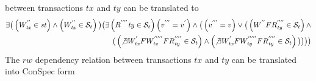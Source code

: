 \documentclass[acmlarge, ,11pt]{acmart}
\begin{document}
    between transactions $\mathit{tx}$ and $\mathit{ty}$ can be translated to \begin{align}\label{eqn:ww}
\begin{split}
 \exists \big( %
 \left( {W}^{''}_\mathit{tx} \in \mathit{st} \right)
   \wedge \left( {W}^{''}_\mathit{tx}  \in  \mathcal{S}_t \right)  \big)
   \big( %
  \exists %
  \left( { R}^{''''}\mathit{ty} \in \mathcal{S}_t \right) %
    \left( {v}^{'''} = {v}^{'} \right)
   \wedge
   \big( \left(  {v}^{'''} = v \right) \vee
  \big( \left( {W}^{''} F { R}^{''''}_\mathit{ty} \in \mathcal{S}_t \right) \wedge \\
   \big( \left(  \not\exists {W}^{'}_\mathit{tx} F {W}^{'''''}_\mathit{tx} F { R}^{''''}_\mathit{ty} \in \mathcal{S}_t \right)
  \wedge  \left(  \not\exists {W}^{'}_\mathit{tx} F {W}^{'''''}_\mathit{ty} F { R}^{''''}_\mathit{ty} \in \mathcal{S}_t \right) \big) \big) \big) \big)
   \end{split}
   \end{align}
 The $rw$ dependency relation between transactions $\mathit{tx}$ and $\mathit{ty}$ can be translated into ConSpec form
\end{document}
